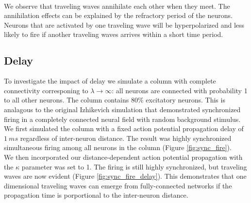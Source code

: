 \documentclass[a4paper,11pt]{article}
\begin{document}
\\
We observe that traveling waves annihilate each other when they meet.
The annihilation effects can be explained by the refractory period of the neurons.
Neurons that are activated by one traveling wave will be hyperpolarized and less likely to fire if another traveling waves arrives within a short time period.

\subsection{Delay}
To investigate the impact of delay we simulate a column with complete connectivity corresponing to $\lambda \rightarrow \infty$: all neurons are connected with probability 1 to all other neurons.
The column contains $80\%$ excitatory neurons.
This is analagous to the original Izhikevich simulation \cite{izzy_code} that demonstrated synchronized firing in a completely connected neural field with random background stimulus.
We first simulated the column with a fixed action potential propagation delay of $1~ms$ regardless of inter-neuron distance.
The result was highly synchronized simultaneous firing among all neurons in the column (Figure \ref{fig:sync_fire}). \\ 
We then incorporated our distance-dependent action potential propagation with the $\kappa$ parameter was set to 1.
The firing is still highly synchronized, but traveling waves are now evident (Figure \ref{fig:sync_fire_delay}).
This demonstrates that one dimensional traveling waves can emerge from fully-connected networks if the propagation time is porportional to the inter-neuron distance.
\end{document}
